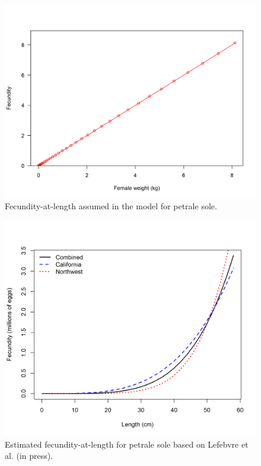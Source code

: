 \documentclass[12pt,]{article}
\begin{document}
\begin{figure}
\centering
\includegraphics{r4ss/plots_mod1/bio8_fecundity_wt.png}
\caption{Fecundity-at-length assumed in the model for petrale sole.
\label{fig:fecundity_model}}
\end{figure}

\begin{figure}
\centering
\includegraphics{Figures/fecundity.png}
\caption{Estimated fecundity-at-length for petrale sole based on
Lefebvre et al. (in press). \label{fig:fecundity}}
\end{figure}
\end{document}
